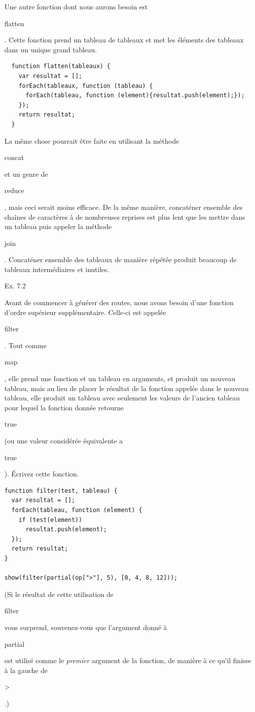 \documentclass{FramateX}
\renewcommand{\texttt}[1]{\begin{sffamily}{#1}\end{sffamily}}
\begin{document}
Une autre fonction dont nous aurons besoin est \texttt{flatten}. Cette
fonction prend un tableau de tableaux et met les éléments des tableaux
dans un unique grand tableau.

\begin{lstlisting}
  function flatten(tableaux) {
    var resultat = [];
    forEach(tableaux, function (tableau) {
      forEach(tableau, function (element){resultat.push(element);});
    });
    return resultat;
  }
\end{lstlisting}
La même chose pourrait être faite en utilisant la méthode
\texttt{concat} et un genre de \texttt{reduce}, mais ceci serait moins
efficace. De la même manière, concaténer ensemble des chaînes de
caractères à de nombreuses reprises est plus lent que les mettre dans un
tableau puis appeler la méthode \texttt{join}. Concaténer ensemble des
tableaux de manière répétée produit beaucoup de tableaux intermédiaires
et inutiles.

\begin{center}\end{center}

Ex. 7.2

Avant de commencer à générer des routes, nous avons besoin d'une
fonction d'ordre supérieur supplémentaire. Celle-ci est appelée
\texttt{filter}. Tout comme \texttt{map}, elle prend une fonction et un
tableau en arguments, et produit un nouveau tableau, mais au lieu de
placer le résultat de la fonction appelée dans le nouveau tableau, elle
produit un tableau avec seulement les valeurs de l'ancien tableau pour
lequel la fonction donnée retourne \texttt{true} (ou une valeur
considérée équivalente a \texttt{true}). Écrivez cette fonction.

\begin{lstlisting}
function filter(test, tableau) {
  var resultat = [];
  forEach(tableau, function (element) {
    if (test(element))
      resultat.push(element);
  });
  return resultat;
}

show(filter(partial(op[">"], 5), [0, 4, 8, 12]));
\end{lstlisting}
(Si le résultat de cette utilisation de \texttt{filter} vous surprend,
souvenez-vous que l'argument donné à \texttt{partial} est utilisé comme
le \emph{premier} argument de la fonction, de manière à ce qu'il finisse
à la gauche de \texttt{\textgreater{}}.)

\begin{center}\end{center}
\end{document}
